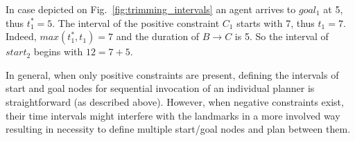 In case depicted on Fig.~\ref{fig:trimming_intervals} an agent arrives to $goal_1$ at 5, thus $t_1^*=5$. The interval of the positive constraint $C_1$ starts with 7, thus $t_1=7$. Indeed, $max(t_1^*, t_1)=7$ and the duration of $B \rightarrow C$ is 5. So the interval of $start_2$ begins with $12=7+5$.

In general, when only positive constraints are present, defining the intervals of start and goal nodes for sequential invocation of an individual planner is straightforward (as described above). However, when negative constraints exist, their time intervals might interfere with the landmarks in a more involved way resulting in necessity to define multiple start/goal nodes and plan between them.

